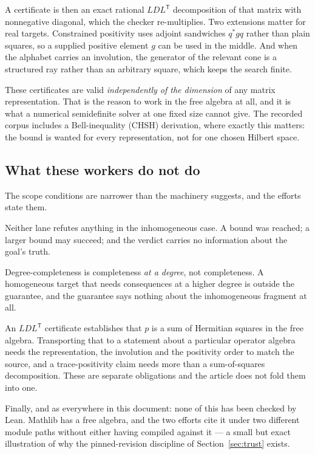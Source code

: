 A certificate is then an exact rational $LDL^{\mathsf T}$ decomposition of that
matrix with nonnegative diagonal, which the checker re-multiplies. Two
extensions matter for real targets. Constrained positivity uses adjoint
sandwiches $q^{*}gq$ rather than plain squares, so a supplied positive element
$g$ can be used in the middle. And when the alphabet carries an involution,
the generator of the relevant cone is a structured ray rather than an arbitrary
square, which keeps the search finite.

\begin{remark}
These certificates are valid \emph{independently of the dimension} of any
matrix representation. That is the reason to work in the free algebra at all,
and it is what a numerical semidefinite solver at one fixed size cannot give.
The recorded corpus includes a Bell-inequality (CHSH) derivation, where exactly
this matters: the bound is wanted for every representation, not for one chosen
Hilbert space.
\end{remark}

\subsection{What these workers do not do}

The scope conditions are narrower than the machinery suggests, and the efforts
state them.

Neither lane refutes anything in the inhomogeneous case. A bound was reached; a
larger bound may succeed; and the \unknown{} verdict carries no information
about the goal's truth.

Degree-completeness is completeness \emph{at a degree}, not completeness. A
homogeneous target that needs consequences at a higher degree is outside the
guarantee, and the guarantee says nothing about the inhomogeneous fragment at
all.

An $LDL^{\mathsf T}$ certificate establishes that $p$ is a sum of Hermitian
squares in the free algebra. Transporting that to a statement about a particular
operator algebra needs the representation, the involution and the positivity
order to match the source, and a trace-positivity claim needs more than a
sum-of-squares decomposition. These are separate obligations and the article
does not fold them into one.

Finally, and as everywhere in this document: none of this has been checked by
Lean. Mathlib has a free algebra, and the two efforts cite it under two
different module paths without either having compiled against it --- a small but
exact illustration of why the pinned-revision discipline of
Section~\ref{sec:trust} exists.
